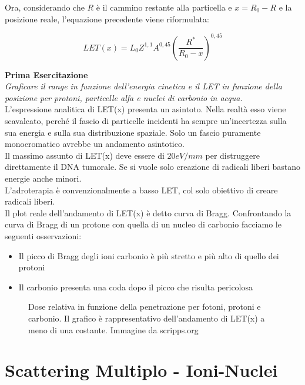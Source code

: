 Ora, considerando che $R$ è il cammino restante alla particella e $x=R_0-R$ e la posizione reale, l'equazione precedente viene riformulata:

\begin{equation}
LET(x)=L_0Z^{1,1}A^{0,45}(\frac{R^*}{R_0-x})^{0,45}
\end{equation}

\textbf{Prima Esercitazione}\\
\emph{Graficare il range in funzione dell'energia cinetica e il LET in funzione della posizione per protoni, particelle alfa e nuclei di carbonio in acqua.}\\

L'espressione analitica di LET(x) presenta un asintoto. Nella realtà esso viene scavalcato, perché il fascio di particelle incidenti ha sempre un'incertezza sulla sua energia e sulla sua distribuzione spaziale. Solo un fascio puramente monocromatico avrebbe un andamento asintotico. \\

Il massimo assunto di LET(x) deve essere di $20 eV/mm$ per distruggere direttamente il DNA tumorale. Se si vuole solo creazione di radicali liberi bastano energie anche minori.\\

L'adroterapia è convenzionalmente a basso LET, col solo obiettivo di creare radicali liberi. \\

Il plot reale dell'andamento di LET(x) è detto curva di Bragg. Confrontando la curva di Bragg di un protone con quella di un nucleo di carbonio facciamo le seguenti osservazioni:

\begin{itemize}
\item Il picco di Bragg degli ioni carbonio è più stretto e più alto di quello dei protoni
\item Il carbonio presenta una coda dopo il picco che risulta pericolosa
\end{itemize}

\begin{figure}[]
\centering
	\caption{Dose relativa in funzione della penetrazione per fotoni, protoni e carbonio. Il grafico è rappresentativo dell'andamento di LET(x) a meno di una costante. Immagine da scripps.org}
	\label{fig:bragg}
\end{figure}


\section{Scattering Multiplo - Ioni-Nuclei}


